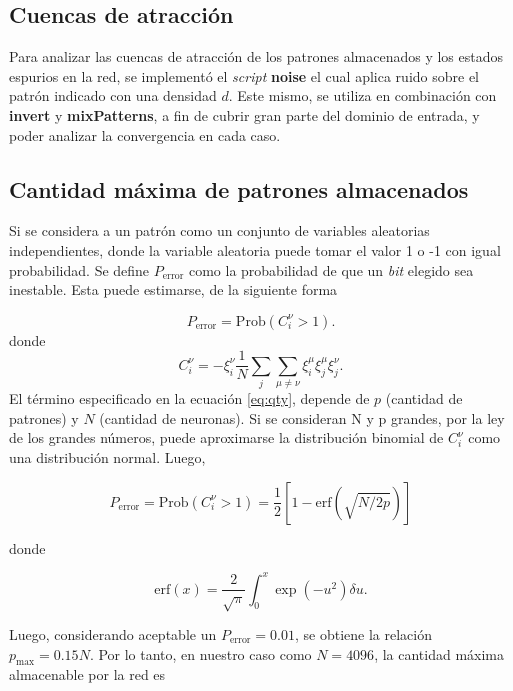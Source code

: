 \documentclass{article}
\begin{document}
\subsection{Cuencas de atracción}

Para analizar las cuencas de atracción de los patrones almacenados y los estados espurios en la red, se implementó
el \emph{script} \textbf{noise} el cual aplica ruido sobre el patrón indicado con una densidad $d$. Este mismo, se utiliza
en combinación con \textbf{invert} y \textbf{mixPatterns}, a fin de cubrir gran parte del dominio de entrada, y poder
analizar la convergencia en cada caso.


\subsection{Cantidad máxima de patrones almacenados}

Si se considera a un patrón como un conjunto de variables aleatorias independientes, donde la variable aleatoria puede tomar el valor 1 o -1 con igual
probabilidad. Se define $P_{\mbox{error}}$ como la probabilidad  de que un \emph{bit} elegido sea inestable. Esta puede estimarse, de la siguiente
forma

\begin{equation}
 P_{\mbox{error}} = \mbox{Prob}(C^{\nu}_i > 1).
\end{equation}
donde
\begin{equation}
 \label{eq:qty}
 C^{\nu}_i = -\xi^{\nu}_i \dfrac{1}{N} \sum_{j} \sum_{\mu \neq \nu} \xi^{\mu}_i \xi^{\mu}_j \xi^{\nu}_j.
\end{equation}
El término especificado en la ecuación \ref{eq:qty}, depende de $p$ (cantidad de patrones) y $N$ (cantidad de neuronas).
Si se consideran N y p grandes, por la ley de los grandes números, puede aproximarse la distribución binomial de $C^{\nu}_i$
como una distribución normal. Luego,

\begin{equation}
 P_{\mbox{error}} = \mbox{Prob}(C^{\nu}_i > 1) = \dfrac{1}{2}[1 - \mbox{erf}(\sqrt{N/2p})]
\end{equation}

donde

\begin{equation*}
 \mbox{erf}(x) = \dfrac{2}{\sqrt{\pi}} \int^x_0 \exp{(-u^2)}\delta u.
\end{equation*}

Luego, considerando aceptable un $P_{\mbox{error}} = 0.01$, se obtiene la relación $p_{\mbox{max}} = 0.15N$.
Por lo tanto, en nuestro caso como $N = 4096$, la cantidad máxima almacenable por la red es 
\end{document}
